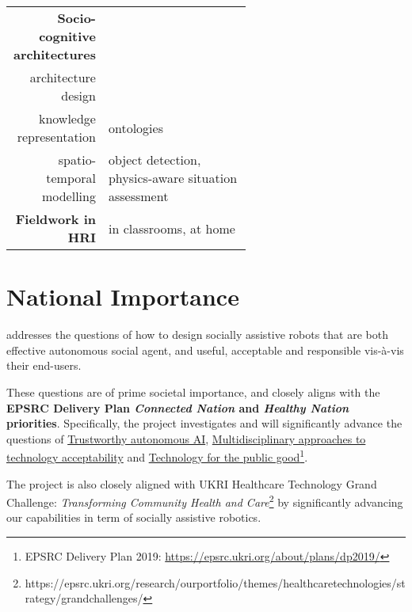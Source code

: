 \begin{table}[h]
\begin{tabular}{rp{0.6\linewidth}}
        \midrule
        \textbf{Socio-cognitive architectures} \\
        architecture design & \small \cite{lemaignan2017artificial, baxter2016cognitive,lemaignan2014challenges,lallee2012towards, mallet2010genom3} \\
        knowledge representation & \small
        ontologies\cite{lemaignan2010oro, lemaignan2013explicit} \\    
        spatio-temporal modelling & \small object
        detection\cite{wallbridge2017qualitative}, physics-aware situation
        assessment\cite{lemaignan2018underworlds}\cite{sallami2019simulation} \\
        \midrule
        \textbf{Fieldwork in HRI} & \small in
        classrooms\cite{hood2015when, lemaignan2016learning, jacq2016building,
        baxter2015wider,kennedy2016cautious,senft2018robots}, at home\cite{mondada2015ranger}\\
        \bottomrule
    \end{tabular}
    \label{pi-expertise}
\end{table}


\section{National Importance}


\project addresses the questions of how to design socially assistive robots that
are both effective autonomous social agent, and useful, acceptable and
responsible vis-à-vis their end-users.

These questions are of prime societal importance, and \project closely
aligns with the \textbf{EPSRC Delivery Plan \emph{Connected Nation} and
\emph{Healthy Nation} priorities}. Specifically, the project
investigates and will significantly advance the questions of \ul{Trustworthy
autonomous AI}, \ul{Multidisciplinary approaches to technology acceptability}
and \ul{Technology for the public good}\footnote{EPSRC Delivery Plan 2019:
\url{https://epsrc.ukri.org/about/plans/dp2019/}}.

The project is also closely aligned with UKRI Healthcare Technology Grand
Challenge: \emph{Transforming Community Health and
Care}\footnote{https://epsrc.ukri.org/research/ourportfolio/themes/healthcaretechnologies/strategy/grandchallenges/}
by significantly advancing our capabilities in term of socially assistive
robotics.

